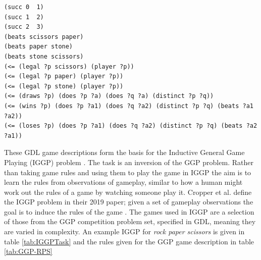 \begin{listing}[ht]
\begin{Verbatim}[frame=single,fontsize=\footnotesize]
(succ 0  1)
(succ 1  2)
(succ 2  3)
(beats scissors paper)
(beats paper stone)
(beats stone scissors)
(<= (legal ?p scissors) (player ?p))
(<= (legal ?p paper) (player ?p))
(<= (legal ?p stone) (player ?p))
(<= (draws ?p) (does ?p ?a) (does ?q ?a) (distinct ?p ?q))
(<= (wins ?p) (does ?p ?a1) (does ?q ?a2) (distinct ?p ?q) (beats ?a1 ?a2))
(<= (loses ?p) (does ?p ?a1) (does ?q ?a2) (distinct ?p ?q) (beats ?a2 ?a1))
\end{Verbatim}
\caption{
A sample of rules from the GDL description of Rock Paper Scissors. The $?$ indicates a variable and $<=$ indicates an implication with the first expression after being the head and the conjugation of the rest making up the body
}
\label{lst:GDL}
\end{listing}



These GDL game descriptions form the basis for the Inductive General Game Playing (IGGP) problem \cite{Cropper/IGGP}. The task is an inversion of the GGP problem. Rather than taking game rules and using them to play the game in IGGP the aim is to learn the rules from observations of gameplay, similar to how a human might work out the rules of a game by watching someone play it. Cropper et al. define the IGGP problem in their 2019 paper; given a set of gameplay observations the goal is to induce the rules of the game \cite{Cropper/IGGP}. The games used in IGGP are a selection of those from the GGP competition problem set, specified in GDL, meaning they are varied in complexity. An example IGGP for \textit{rock paper scissors} is given in table \ref{tab:IGGPTask} and the rules given for the GGP game description in table \ref{tab:GGP-RPS}

